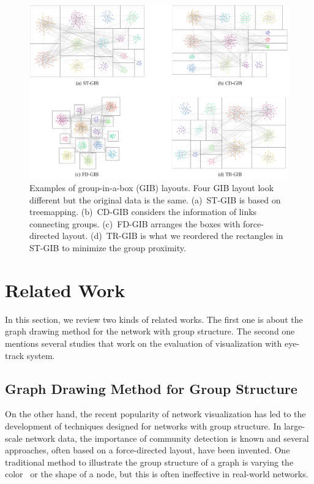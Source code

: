 \documentclass[review]{vgtc}                 %
\begin{document}
\begin{figure}[t]
  \begin{center}
    \includegraphics[width=1\textwidth]{pictures/examples.png}
    \caption{Examples of group-in-a-box (GIB) layouts. Four GIB layout look different but the original data is the same. (a)~ST-GIB is based on treemapping. (b)~CD-GIB considers the information of links connecting groups. (c)~FD-GIB arranges the boxes with force-directed layout. (d)~TR-GIB is what we reordered the rectangles in ST-GIB to minimize the group proximity.}
    \label{GIB-examples}
  \end{center}
\end{figure}

%
\section{Related Work}
%
In this section, we review two kinds of related works.
The first one is about the graph drawing method for the network with group structure.
The second one mentions several studies that work on the evaluation of visualization with eye-track system.


\subsection{Graph Drawing Method for Group Structure}

On the other hand, the recent popularity of network visualization has led to the development of techniques designed for networks with group structure.
In large-scale network data, the importance of community detection is known and several approaches, often based on a force-directed layout, have been invented. One traditional method to illustrate the group structure of a graph is varying the color~\cite{mcpherson2005discovering} or the shape of a node, but this is often ineffective in real-world networks.
\end{document}
